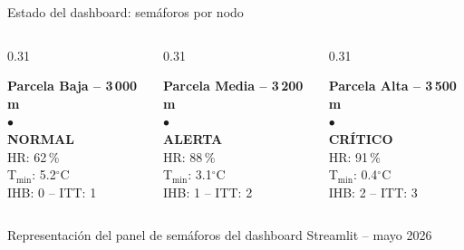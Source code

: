 \documentclass[14pt,aspectratio=169]{beamer}
\begin{document}
\begin{frame}{Estado del dashboard: sem\'aforos por nodo}
  \vspace{0.2em}
  \begin{columns}[c]
    \begin{column}{0.31\textwidth}
      \centering
      \begin{tcolorbox}[colback=green!10, colframe=green!50!black,
          title=\textbf{NODO-001}, fonttitle=\bfseries,
          colbacktitle=green!60!black, center title]
        \centering
        \footnotesize\textbf{Parcela Baja -- 3\,000 m}\\[0.4em]
        {\Huge\textcolor{green!60!black}{$\bullet$}}\\[0.2em]
        {\color{green!60!black}\textbf{NORMAL}}\\[0.3em]
        \footnotesize HR: 62\,\%\\
        T$_{\min}$: 5.2$^{\circ}$C\\
        IHB: 0 -- ITT: 1
      \end{tcolorbox}
    \end{column}
    \begin{column}{0.31\textwidth}
      \centering
      \begin{tcolorbox}[colback=orange!10, colframe=orange!70!black,
          title=\textbf{NODO-002}, fonttitle=\bfseries,
          colbacktitle=orange!80, center title]
        \centering
        \footnotesize\textbf{Parcela Media -- 3\,200 m}\\[0.4em]
        {\Huge\textcolor{orange!80!black}{$\bullet$}}\\[0.2em]
        {\color{orange!80!black}\textbf{ALERTA}}\\[0.3em]
        \footnotesize HR: 88\,\%\\
        T$_{\min}$: 3.1$^{\circ}$C\\
        IHB: 1 -- ITT: 2
      \end{tcolorbox}
    \end{column}
    \begin{column}{0.31\textwidth}
      \centering
      \begin{tcolorbox}[colback=red!10, colframe=red!70!black,
          title=\textbf{NODO-003}, fonttitle=\bfseries,
          colbacktitle=red!70!black, center title]
        \centering
        \footnotesize\textbf{Parcela Alta -- 3\,500 m}\\[0.4em]
        {\Huge\textcolor{red!70!black}{$\bullet$}}\\[0.2em]
        {\color{red!70!black}\textbf{CR\'ITICO}}\\[0.3em]
        \footnotesize HR: 91\,\%\\
        T$_{\min}$: 0.4$^{\circ}$C\\
        IHB: 2 -- ITT: 3
      \end{tcolorbox}
    \end{column}
  \end{columns}
  \vspace{0.3em}
  \centering\footnotesize\textcolor{agrogris}{%
    Representaci\'on del panel de sem\'aforos del dashboard Streamlit
    -- mayo 2026}
\end{frame}
\end{document}
